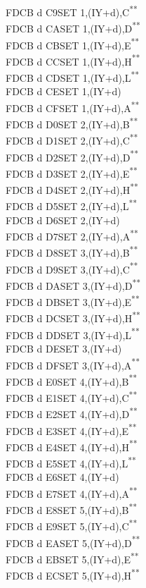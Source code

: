 \documentclass[twoside,openright,a4paper]{book}
\newcommand{\UNDOC}{\textnormal{\textsuperscript{**}}}
\begin{document}
\begin{multicols}{3}
{\begin{tabbing}
	FDCB d C9\>SET 1,(IY+d),C\UNDOC\\
	FDCB d CA\>SET 1,(IY+d),D\UNDOC\\
	FDCB d CB\>SET 1,(IY+d),E\UNDOC\\
	FDCB d CC\>SET 1,(IY+d),H\UNDOC\\
	FDCB d CD\>SET 1,(IY+d),L\UNDOC\\
	FDCB d CE\>SET 1,(IY+d)\\
	FDCB d CF\>SET 1,(IY+d),A\UNDOC\\
	FDCB d D0\>SET 2,(IY+d),B\UNDOC\\
	FDCB d D1\>SET 2,(IY+d),C\UNDOC\\
	FDCB d D2\>SET 2,(IY+d),D\UNDOC\\
	FDCB d D3\>SET 2,(IY+d),E\UNDOC\\
	FDCB d D4\>SET 2,(IY+d),H\UNDOC\\
	FDCB d D5\>SET 2,(IY+d),L\UNDOC\\
	FDCB d D6\>SET 2,(IY+d)\\
	FDCB d D7\>SET 2,(IY+d),A\UNDOC\\
	FDCB d D8\>SET 3,(IY+d),B\UNDOC\\
	FDCB d D9\>SET 3,(IY+d),C\UNDOC\\
	FDCB d DA\>SET 3,(IY+d),D\UNDOC\\
	FDCB d DB\>SET 3,(IY+d),E\UNDOC\\
	FDCB d DC\>SET 3,(IY+d),H\UNDOC\\
	FDCB d DD\>SET 3,(IY+d),L\UNDOC\\
	FDCB d DE\>SET 3,(IY+d)\\
	FDCB d DF\>SET 3,(IY+d),A\UNDOC\\
	FDCB d E0\>SET 4,(IY+d),B\UNDOC\\
	FDCB d E1\>SET 4,(IY+d),C\UNDOC\\
	FDCB d E2\>SET 4,(IY+d),D\UNDOC\\
	FDCB d E3\>SET 4,(IY+d),E\UNDOC\\
	FDCB d E4\>SET 4,(IY+d),H\UNDOC\\
	FDCB d E5\>SET 4,(IY+d),L\UNDOC\\
	FDCB d E6\>SET 4,(IY+d)\\
	FDCB d E7\>SET 4,(IY+d),A\UNDOC\\
	FDCB d E8\>SET 5,(IY+d),B\UNDOC\\
	FDCB d E9\>SET 5,(IY+d),C\UNDOC\\
	FDCB d EA\>SET 5,(IY+d),D\UNDOC\\
	FDCB d EB\>SET 5,(IY+d),E\UNDOC\\
	FDCB d EC\>SET 5,(IY+d),H\UNDOC\\

\end{tabbing}}
\end{multicols}
\end{document}
